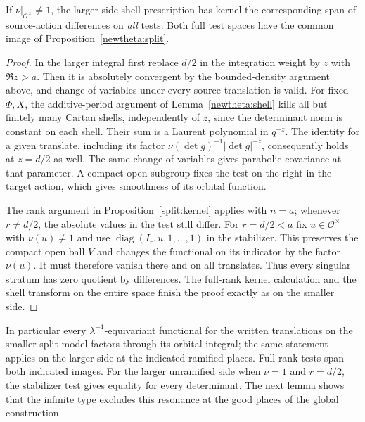 \begin{corollary}\label{split:ram}
If \(\nu|_{\mathcal O^\times}\ne1\), the larger-side shell prescription
has kernel the corresponding span of source-action differences on
\emph{all} tests. Both full test spaces have the common image of
Proposition~\ref{newtheta:split}.
\end{corollary}
\begin{proof}
In the larger integral first replace \(d/2\) in the integration weight
by \(z\) with \(\Re z>a\). Then it is absolutely convergent by the
bounded-density argument above, and change of variables under every
source translation is valid. For fixed \(\Phi,X\), the additive-period
argument of Lemma~\ref{newtheta:shell} kills all but finitely many
Cartan shells, independently of \(z\), since the determinant norm is
constant on each shell. Their sum is a Laurent polynomial in \(q^{-z}\).
The identity for a given translate, including its factor
\(\nu(\det g)^{-1}|\det g|^{-z}\), consequently holds at \(z=d/2\)
as well. The same change of variables gives parabolic covariance at
that parameter. A compact open subgroup fixes the test on the right
in the target action, which gives smoothness of its orbital function.

The rank argument in Proposition~\ref{split:kernel} applies with
\(n=a\); whenever \(r\ne d/2\), the absolute values in the test
still differ. For \(r=d/2<a\) fix \(u\in\mathcal O^\times\) with
\(\nu(u)\ne1\) and use \(\operatorname{diag}(I_r,u,1,\ldots,1)\)
in the stabilizer. This preserves the compact open ball \(V\) and
changes the functional on its indicator by the factor \(\nu(u)\).
It must therefore vanish there and on all translates. Thus every
singular stratum has zero quotient by differences. The full-rank
kernel calculation and the shell transform on the entire space finish
the proof exactly as on the smaller side.
\end{proof}
In particular every \(\lambda^{-1}\)-equivariant functional for the written
translations on the smaller split model factors through its orbital integral; the same statement applies on
the larger side at the indicated ramified places. Full-rank tests span
both indicated images. For the larger unramified side when \(\nu=1\)
and \(r=d/2\), the stabilizer test gives equality for every determinant.
The next lemma shows that the infinite type excludes this resonance
at the good places of the global construction.


